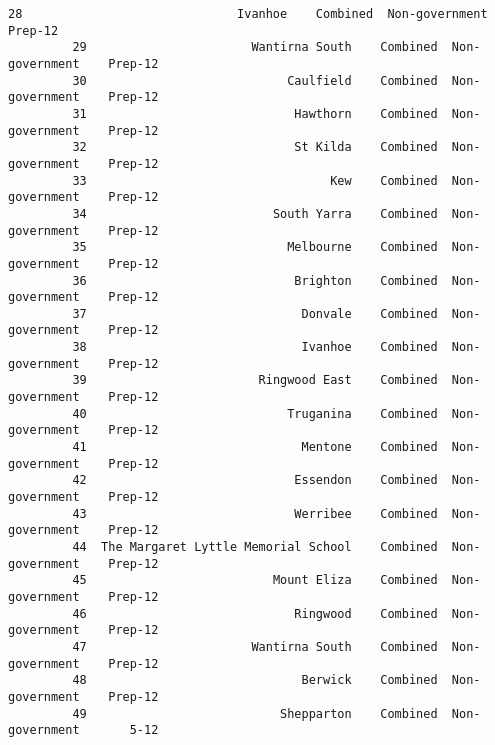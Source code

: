 \documentclass[11pt]{article}
\begin{document}
\begin{Verbatim}[commandchars=\\\{\}]
         28                              Ivanhoe    Combined  Non-government    Prep-12  
         29                       Wantirna South    Combined  Non-government    Prep-12  
         30                            Caulfield    Combined  Non-government    Prep-12  
         31                             Hawthorn    Combined  Non-government    Prep-12  
         32                             St Kilda    Combined  Non-government    Prep-12  
         33                                  Kew    Combined  Non-government    Prep-12  
         34                          South Yarra    Combined  Non-government    Prep-12  
         35                            Melbourne    Combined  Non-government    Prep-12  
         36                             Brighton    Combined  Non-government    Prep-12  
         37                              Donvale    Combined  Non-government    Prep-12  
         38                              Ivanhoe    Combined  Non-government    Prep-12  
         39                        Ringwood East    Combined  Non-government    Prep-12  
         40                            Truganina    Combined  Non-government    Prep-12  
         41                              Mentone    Combined  Non-government    Prep-12  
         42                             Essendon    Combined  Non-government    Prep-12  
         43                             Werribee    Combined  Non-government    Prep-12  
         44  The Margaret Lyttle Memorial School    Combined  Non-government    Prep-12  
         45                          Mount Eliza    Combined  Non-government    Prep-12  
         46                             Ringwood    Combined  Non-government    Prep-12  
         47                       Wantirna South    Combined  Non-government    Prep-12  
         48                              Berwick    Combined  Non-government    Prep-12  
         49                           Shepparton    Combined  Non-government       5-12  
\end{Verbatim}
            

    
    
    
    
\end{document}
